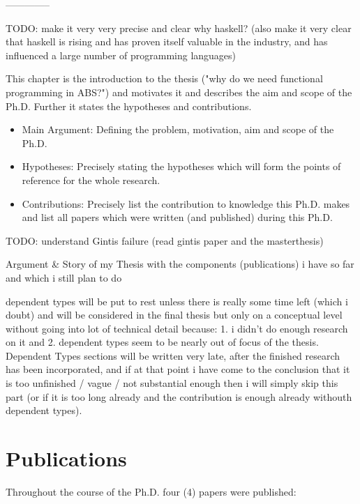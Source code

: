 --------------

TODO: make it very very precise and clear why haskell? (also make it very clear that haskell is rising and has proven itself valuable in the industry, and has influenced a large number of programming languages)

This chapter is the introduction to the thesis ("why do we need functional programming in ABS?") and motivates it and describes the aim and scope of the Ph.D. Further it states the hypotheses and contributions. 
\begin{itemize}
	\item Main Argument: Defining the problem, motivation, aim and scope of the Ph.D.
	\item Hypotheses: Precisely stating the hypotheses which will form the points of reference for the whole research.
	\item Contributions: Precisely list the contribution to knowledge this Ph.D. makes and list all papers which were written (and published) during this Ph.D.
\end{itemize}

TODO: understand Gintis failure (read gintis paper and the masterthesis)

Argument \& Story of my Thesis with the components (publications) i have so far and which i still plan to do

dependent types will be put to rest unless there is really some time left (which i doubt) and will be considered in the final thesis but only on a conceptual level without going into lot of technical detail because: 1. i didn't do enough research on it and 2. dependent types seem to be nearly out of focus of the thesis. Dependent Types sections will be written very late, after the finished research has been incorporated, and if at that point i have come to the conclusion that it is too unfinished / vague / not substantial enough then i will simply skip this part (or if it is too long already and the contribution is enough already withouth dependent types).

\section{Publications}
Throughout the course of the Ph.D. four (4) papers were published:

